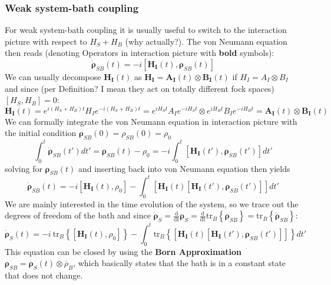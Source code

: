 	\subsubsection{Weak system-bath coupling}
	For weak system-bath coupling it is usually useful to switch to the interaction picture with respect to $H_S + H_B$ (why actually?). The von Neumann equation then reads (denoting Operators in interaction picture with \textbf{bold} symbols):
	\begin{equation}
		\dot{\boldsymbol{\rho}}_{SB}(t) =	-i \left[\mathbf{H_I}(t), \boldsymbol{\rho}_{SB}(t)\right]
	\end{equation}
	We can usually decompose $\mathbf{H_I}(t)$  as $\mathbf{H_I} =	\mathbf{A_I}(t) \otimes \mathbf{B_I}(t)$ if $H_I =	A_I \otimes B_I$ and since (per Definition? I mean they act on totally different fock spaces) $\left[H_S, H_B\right] =	0$:
	\begin{equation}
		\mathbf{H_I}(t) =	e^{i (H_S + H_B)t} H_I e^{-i (H_S + H_B)t} =	e^{i H_S t} A_I e^{- i H_S t} \otimes e^{i H_B t} B_I e^{-i H_B t} =	\mathbf{A_I}(t) \otimes \mathbf{B_I}(t)
	\end{equation}
	We can formally integrate the von Neumann equation in interaction picture with the initial condition $\boldsymbol{\rho}_{SB}(0) = \rho_{SB}(0) =	\rho_0$
	\begin{equation}
		\int_{0}^{t} \dot{\boldsymbol{\rho}}_{SB}(t') dt' =	\boldsymbol{\rho}_{SB}(t) - \rho_0 = -i \int_{0}^{t} \left[\mathbf{H_I}(t'), \boldsymbol{\rho}_{SB}(t')\right]	dt'
	\end{equation}
	solving for $\boldsymbol{\rho}_{SB}(t)$ and inserting back into von Neumann equation then yields
	\begin{equation}
		\dot{\boldsymbol{\rho}}_{SB}(t) =	-i \left[\mathbf{H_I}(t), \rho_0 \right] -\int_{0}^{t} \left[\mathbf{H_I}(t)\left[\mathbf{H_I}(t'), \boldsymbol{\rho}_{SB}(t')\right]\right]	dt'
	\end{equation}
	We are mainly interested in the time evolution of the system, so we trace out the degrees of freedom of the bath and since $\dot{\boldsymbol{\rho}}_S =	\frac{\text{d}}{\text{dt}} \boldsymbol{\rho}_S =	\frac{\text{d}}{\text{dt}} \text{tr}_B\left\{ \boldsymbol{\rho}_{SB}\right\} = \text{tr}_B\left\{ \dot{\boldsymbol{\rho}}_{SB}\right\}$:
	\begin{equation}
		\dot{\boldsymbol{\rho}}_{S}(t) =	-i ~\text{tr}_B \left\{\left[\mathbf{H_I}(t), \rho_0 \right]\right\} - \int_{0}^{t} \text{tr}_B \left\{\left[\mathbf{H_I}(t)\left[\mathbf{H_I}(t'), \boldsymbol{\rho}_{SB}(t')\right]\right]\right\}	dt'
	\end{equation}
	This equation can be closed by using the \textbf{Born Approximation} $\boldsymbol{\rho}_{SB} =	\boldsymbol{\rho}_S(t) \otimes \overline{\rho}_B$, which basically states that the bath is in a constant state that does not change.
